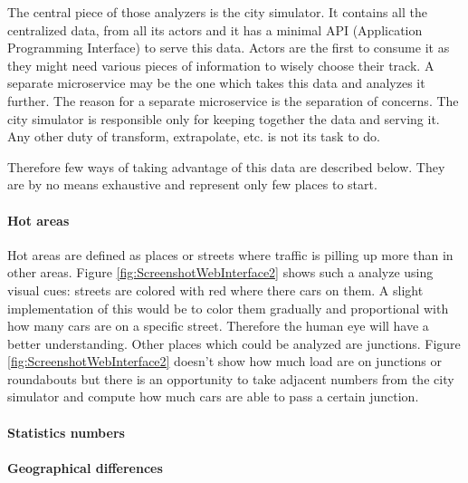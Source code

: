 \documentclass[a4paper,12pt,twoside]{book}
\begin{document}
The central piece of those analyzers is the city simulator. It contains all the centralized data, from all its actors and it has a minimal API (Application Programming Interface) to serve this data. Actors are the first to consume it as they might need various pieces of information to wisely choose their track. A separate microservice may be the one which takes this data and analyzes it further. The reason for a separate microservice is the separation of concerns. The city simulator is responsible only for keeping together the data and serving it. Any other duty of transform, extrapolate, etc. is not its task to do.

Therefore few ways of taking advantage of this data are described below. They are by no means exhaustive and represent only few places to start.

\paragraph{Hot areas}

Hot areas are defined as places or streets where traffic is pilling up more than in other areas. Figure \ref{fig:ScreenshotWebInterface2} \citep{microservicestrafficsimulation} shows such a analyze using visual cues: streets are colored with red where there cars on them. A slight implementation of this would be to color them gradually and proportional with how many cars are on a specific street. Therefore the human eye will have a better understanding. Other places which could be analyzed are junctions. Figure \ref{fig:ScreenshotWebInterface2} doesn't show how much load are on junctions or roundabouts but there is an opportunity to take adjacent numbers from the city simulator and compute how much cars are able to pass a certain junction.

\paragraph{Statistics numbers}

\paragraph{Geographical differences}


\end{document}
